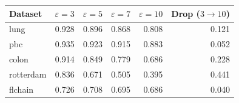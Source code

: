 \begin{tabular}{lrrrrr}
  \toprule
Dataset & $\varepsilon = 3$ & $\varepsilon = 5$ & $\varepsilon = 7$ & $\varepsilon = 10$ & Drop ($3 \to 10$) \\ 
  \midrule
lung & 0.928 & 0.896 & 0.868 & 0.808 & 0.121 \\ 
  pbc & 0.935 & 0.923 & 0.915 & 0.883 & 0.052 \\ 
  colon & 0.914 & 0.849 & 0.779 & 0.686 & 0.228 \\ 
  rotterdam & 0.836 & 0.671 & 0.505 & 0.395 & 0.441 \\ 
  flchain & 0.726 & 0.708 & 0.695 & 0.686 & 0.040 \\ 
   \bottomrule
\end{tabular}
